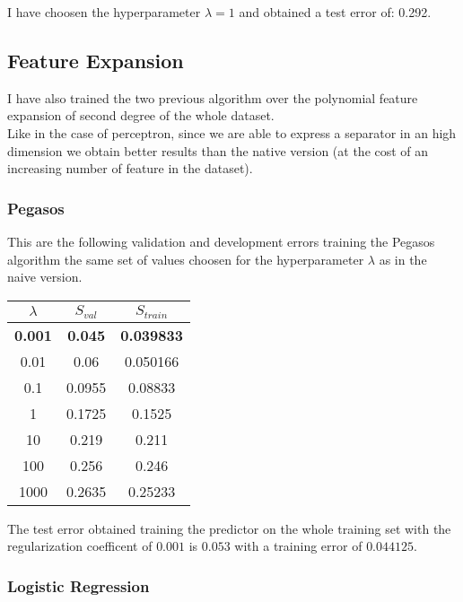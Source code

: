 I have choosen the hyperparameter $\lambda = 1$ and obtained a test error of: 0.292.\\

\subsection{Feature Expansion}
I have also trained the two previous algorithm over the polynomial feature expansion of second degree of the whole dataset.\\
Like in the case of perceptron, since we are able to express a separator in an high dimension we obtain better results than the native version (at the cost of an increasing number of feature in the dataset).\\  
\subsubsection{Pegasos}
This are the following validation and development errors training the Pegasos algorithm the same set of values choosen for the hyperparameter $\lambda$ as in the naive version.\\

\begin{center}
    \begin{tabular}{| c | c | c |}
        \hline
        $\lambda$ & $S_{val}$ & $S_{train}$ \\
        \hline
        \textbf{0.001} & \textbf{0.045} & \textbf{0.039833} \\
        \hline
        0.01 & 0.06 & 0.050166 \\
        \hline
        0.1 & 0.0955 & 0.08833 \\
        \hline
        1 & 0.1725 & 0.1525 \\
        \hline
        10 & 0.219 & 0.211 \\
        \hline
        100 & 0.256 & 0.246 \\
        \hline
        1000 & 0.2635 & 0.25233 \\
        \hline
    \end{tabular}
\end{center}

The test error obtained training the predictor on the whole training set with the regularization coefficent of $0.001$ is $0.053$ with a training error of $0.044125$.\\

\subsubsection{Logistic Regression}

